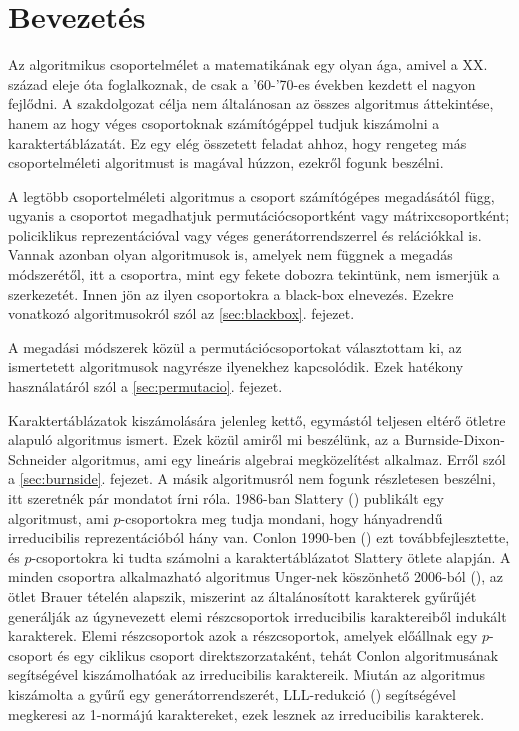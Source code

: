 \section*{Bevezetés}
\label{sec:bevezetes}
Az algoritmikus csoportelmélet a matematikának egy olyan ága, amivel a XX. század eleje óta foglalkoznak,
de csak a '60-'70-es években kezdett el nagyon fejlődni.
A szakdolgozat célja nem általánosan az összes algoritmus áttekintése, hanem
az hogy véges csoportoknak számítógéppel tudjuk kiszámolni a karaktertáblázatát.
Ez egy elég összetett feladat ahhoz, hogy rengeteg más csoportelméleti algoritmust is magával húzzon,
ezekről fogunk beszélni.

A legtöbb csoportelméleti algoritmus a csoport számítógépes megadásától függ, ugyanis
a csoportot megadhatjuk permutációcsoportként vagy mátrixcsoportként; policiklikus reprezentációval vagy
véges generátorrendszerrel és relációkkal is.
Vannak azonban olyan algoritmusok is, amelyek nem függnek a megadás módszerétől,
itt a csoportra, mint egy fekete dobozra tekintünk, nem ismerjük a szerkezetét.
Innen jön az ilyen csoportokra a black-box elnevezés.
Ezekre vonatkozó algoritmusokról szól az \ref{sec:blackbox}. fejezet.

A megadási módszerek közül a permutációcsoportokat választottam ki, az ismertetett algoritmusok nagyrésze ilyenekhez kapcsolódik.
Ezek hatékony használatáról szól a \ref{sec:permutacio}. fejezet.

Karaktertáblázatok kiszámolására jelenleg kettő, egymástól teljesen eltérő ötletre alapuló algoritmus ismert.
Ezek közül amiről mi beszélünk, az a Burnside-Dixon-Schneider algoritmus, ami egy lineáris algebrai megközelítést alkalmaz.
Erről szól a \ref{sec:burnside}. fejezet.
A másik algoritmusról nem fogunk részletesen beszélni, itt szeretnék pár mondatot írni róla.
1986-ban Slattery (\cite{Sla86}) publikált egy algoritmust, ami $p$-csoportokra meg tudja mondani, hogy hányadrendű irreducibilis reprezentációból hány van.
Conlon 1990-ben (\cite{Con90}) ezt továbbfejlesztette, és $p$-csoportokra ki tudta számolni a karaktertáblázatot Slattery ötlete alapján.
A minden csoportra alkalmazható algoritmus Unger-nek köszönhető 2006-ból (\cite{Ung06}), az ötlet Brauer tételén alapszik, miszerint az általánosított karakterek gyűrűjét generálják
az úgynevezett elemi részcsoportok irreducibilis karaktereiből indukált karakterek.
Elemi részcsoportok azok a részcsoportok, amelyek előállnak egy $p$-csoport és egy ciklikus csoport direktszorzataként, tehát Conlon algoritmusának segítségével kiszámolhatóak az irreducibilis karaktereik.
Miután az algoritmus kiszámolta a gyűrű egy generátorrendszerét, LLL-redukció (\cite{LLL82}) segítségével megkeresi az 1-normájú karaktereket, ezek lesznek az irreducibilis karakterek.

